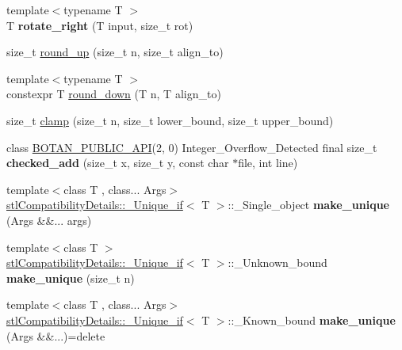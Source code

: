 \begin{DoxyCompactItemize}
\mbox{\label{namespace_botan_a61ca235c27bdd517ad57cb4aceedc293}} 
{\footnotesize template$<$typename T $>$ }\\T {\bfseries rotate\+\_\+right} (T input, size\+\_\+t rot)
\item 
size\+\_\+t \mbox{\hyperlink{namespace_botan_af02949267c5d95ff4e34cb64c5404a4f}{round\+\_\+up}} (size\+\_\+t n, size\+\_\+t align\+\_\+to)
\item 
{\footnotesize template$<$typename T $>$ }\\constexpr T \mbox{\hyperlink{namespace_botan_a4595be1d36c60aea04cc4fad870956a3}{round\+\_\+down}} (T n, T align\+\_\+to)
\item 
size\+\_\+t \mbox{\hyperlink{namespace_botan_a9c7c302096cd87d7a8a12d6038260206}{clamp}} (size\+\_\+t n, size\+\_\+t lower\+\_\+bound, size\+\_\+t upper\+\_\+bound)
\item 
\mbox{\label{namespace_botan_af75a40ef6a77466c684ada94014632e3}} 
class \mbox{\hyperlink{namespace_botan_a6b9388030d872e586a4655b776ac9501}{B\+O\+T\+A\+N\+\_\+\+P\+U\+B\+L\+I\+C\+\_\+\+A\+PI}}(2, 0) Integer\+\_\+\+Overflow\+\_\+\+Detected final size\+\_\+t {\bfseries checked\+\_\+add} (size\+\_\+t x, size\+\_\+t y, const char $\ast$file, int line)
\item 
\mbox{\label{namespace_botan_a3811c4287a0d079ec6e9b410972e9143}} 
{\footnotesize template$<$class T , class... Args$>$ }\\\mbox{\hyperlink{struct_botan_1_1stl_compatibility_details_1_1___unique__if}{stl\+Compatibility\+Details\+::\+\_\+\+Unique\+\_\+if}}$<$ T $>$\+::\+\_\+\+Single\+\_\+object {\bfseries make\+\_\+unique} (Args \&\&... args)
\item 
\mbox{\label{namespace_botan_a4c08c160dffb172a0d2d9bf337f1f199}} 
{\footnotesize template$<$class T $>$ }\\\mbox{\hyperlink{struct_botan_1_1stl_compatibility_details_1_1___unique__if}{stl\+Compatibility\+Details\+::\+\_\+\+Unique\+\_\+if}}$<$ T $>$\+::\+\_\+\+Unknown\+\_\+bound {\bfseries make\+\_\+unique} (size\+\_\+t n)
\item 
\mbox{\label{namespace_botan_a180599704059ab6286b035d87dbbeb89}} 
{\footnotesize template$<$class T , class... Args$>$ }\\\mbox{\hyperlink{struct_botan_1_1stl_compatibility_details_1_1___unique__if}{stl\+Compatibility\+Details\+::\+\_\+\+Unique\+\_\+if}}$<$ T $>$\+::\+\_\+\+Known\+\_\+bound {\bfseries make\+\_\+unique} (Args \&\&...)=delete

\end{DoxyCompactItemize}
